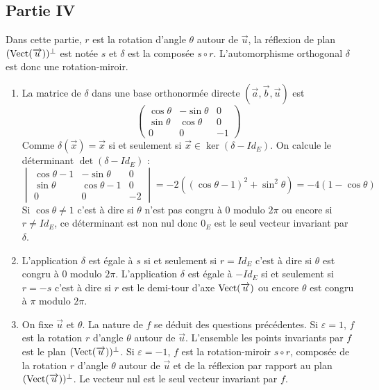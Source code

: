 \subsection*{Partie IV}
Dans cette partie, $r$ est la rotation d'angle $\theta$ autour de $\overrightarrow u$, la réflexion de plan $(\operatorname{Vect}(\overrightarrow u))^\perp$ est notée $s$ et $\delta$ est la composée $s\circ r$. L'automorphisme orthogonal $\delta$ est donc une rotation-miroir.
\begin{enumerate}
 \item La matrice de $\delta$ dans une base orthonormée directe $(\overrightarrow a , \overrightarrow b , \overrightarrow u)$ est
\begin{displaymath}
 \begin{pmatrix}
  \cos \theta & -\sin \theta & 0 \\
\sin \theta & \cos \theta & 0 \\
0 & 0 & -1
 \end{pmatrix}
\end{displaymath}
Comme $\delta(\overrightarrow x)=\overrightarrow x$ si et seulement si $\overrightarrow x \in \ker (\delta - Id_E)$. On calcule le déterminant $\det (\delta - Id_E)$ :
\begin{displaymath}
\begin{vmatrix}
\cos \theta -1 & -\sin \theta & 0 \\
\sin \theta & \cos \theta -1& 0 \\
0 & 0 & -2
\end{vmatrix}
=-2\left( (\cos \theta -1)^2+\sin^2\theta\right)
=-4(1-\cos\theta) 
\end{displaymath}
Si $\cos\theta \neq 1$ c'est à dire si $\theta$ n'est pas congru à $0$ modulo $2\pi$ ou encore si $r\neq Id_E$, ce déterminant est non nul donc $0_E$ est le seul vecteur invariant par $\delta$. 
\item L'application $\delta$ est égale à $s$  si et seulement si $r=Id_E$ c'est à dire si $\theta$ est congru à $0$ modulo $2\pi$.\newline
L'application $\delta$ est égale à $-Id_E$  si et seulement si $r=-s$ c'est à dire si $r$ est le demi-tour d'axe $\operatorname{Vect}(\overrightarrow u)$ ou encore $\theta$ est congru à $\pi$ modulo $2\pi$.
\item On fixe $\overrightarrow u$ et $\theta$. La nature de $f$ se déduit des questions précédentes.\newline
Si $\varepsilon=1$, $f$ est la rotation $r$ d'angle $\theta$ autour de $\overrightarrow u$. L'ensemble les points invariants par $f$ est le plan $(\operatorname{Vect}(\overrightarrow u))^\perp$.\newline
Si $\varepsilon=-1$, $f$ est la rotation-miroir $s\circ r$, composée de la rotation $r$ d'angle $\theta$ autour de $\overrightarrow u$ et de la réflexion par rapport au plan $(\operatorname{Vect}(\overrightarrow u))^\perp$. Le vecteur nul est le seul vecteur invariant par $f$.
\end{enumerate}
